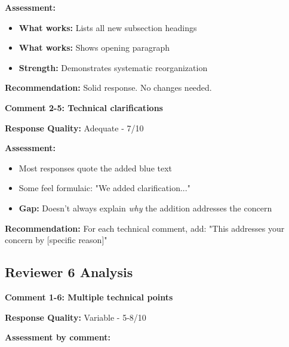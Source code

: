 \documentclass[11pt]{article}
\begin{document}
\textbf{Assessment:}
\begin{itemize}[leftmargin=*]
\item \textbf{What works:} Lists all new subsection headings
\item \textbf{What works:} Shows opening paragraph
\item \textbf{Strength:} Demonstrates systematic reorganization
\end{itemize}

\textbf{Recommendation:} Solid response. No changes needed.

\vspace{0.3cm}

\textbf{Comment 2-5: Technical clarifications}

\textbf{Response Quality:} \textcolor{warning}{Adequate - 7/10}

\textbf{Assessment:}
\begin{itemize}[leftmargin=*]
\item Most responses quote the added blue text
\item Some feel formulaic: "We added clarification..."
\item \textbf{Gap:} Doesn't always explain \textit{why} the addition addresses the concern
\end{itemize}

\textbf{Recommendation:} For each technical comment, add: "This addresses your concern by [specific reason]"

\subsection{Reviewer 6 Analysis}

\textbf{Comment 1-6: Multiple technical points}

\textbf{Response Quality:} \textcolor{warning}{Variable - 5-8/10}

\textbf{Assessment by comment:}
\end{document}
